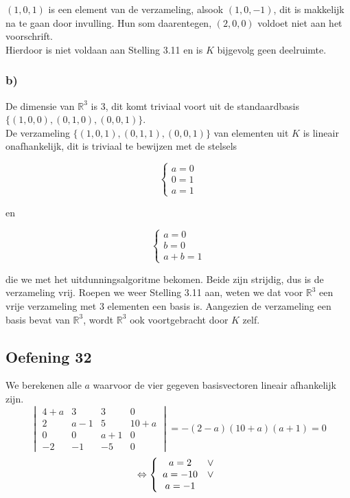 \documentclass[lineaire_algebra_oplossingen.tex]{subfiles}
\begin{document}
$(1,0,1)$ is een element van de verzameling, alsook $(1,0,-1)$, dit is makkelijk na te gaan door invulling. Hun som daarentegen, $(2,0,0)$ voldoet niet aan het voorschrift.\\

Hierdoor is niet voldaan aan Stelling 3.11 en is $K$ bijgevolg geen deelruimte.

\subsubsection*{b)}

De dimensie van $\mathbb{R}^3$ is 3, dit komt triviaal voort uit de standaardbasis $\{(1,0,0),(0,1,0),(0,0,1)\}$.\\

De verzameling $\{(1,0,1),(0,1,1),(0,0,1)\}$ van elementen uit $K$ is lineair onafhankelijk, dit is triviaal te bewijzen met de stelsels

\[
\left\{
\begin{array}{l}
a = 0\\
0 = 1\\
a = 1
\end{array} \right.
\]

en

\[
\left\{
\begin{array}{l}
a = 0\\
b = 0\\
a + b = 1
\end{array} \right.
\]

die we met het uitdunningsalgoritme bekomen. Beide zijn strijdig, dus is de verzameling vrij. Roepen we weer Stelling 3.11 aan, weten we dat voor $\mathbb{R}^3$ een vrije verzameling met 3 elementen een basis is. Aangezien de verzameling een basis bevat van $\mathbb{R}^3$, wordt $\mathbb{R}^3$ ook voortgebracht door $K$ zelf.

\subsection{Oefening 32}
We berekenen alle $a$ waarvoor de vier gegeven basisvectoren lineair afhankelijk zijn.
\[
\begin{vmatrix}
4+a & 3 & 3 & 0\\
2 & a-1 & 5 & 10+a\\
0 & 0 & a+1 & 0\\
-2 & -1 & -5 & 0
\end{vmatrix}
= -(2-a)(10+a)(a+1)=0
\]
\[
\Leftrightarrow 
\left\lbrace
\begin{array}{c c}
a = 2 &\vee\\
a = -10 &\vee\\
a = -1\\
\end{array}
\right.
\]
\end{document}
